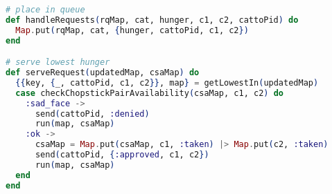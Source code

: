\begin{lstlisting}[language=Elixir, title=Serving request with the lowest hunger value]
# place in queue
def handleRequests(rqMap, cat, hunger, c1, c2, cattoPid) do
  Map.put(rqMap, cat, {hunger, cattoPid, c1, c2})
end

# serve lowest hunger
def serveRequest(updatedMap, csaMap) do
  {{key, {_, cattoPid, c1, c2}}, map} = getLowestIn(updatedMap)
  case checkChopstickPairAvailability(csaMap, c1, c2) do
    :sad_face ->
      send(cattoPid, :denied)
      run(map, csaMap)
    :ok ->
      csaMap = Map.put(csaMap, c1, :taken) |> Map.put(c2, :taken)
      send(cattoPid, {:approved, c1, c2})
      run(map, csaMap)
  end
end
\end{lstlisting}